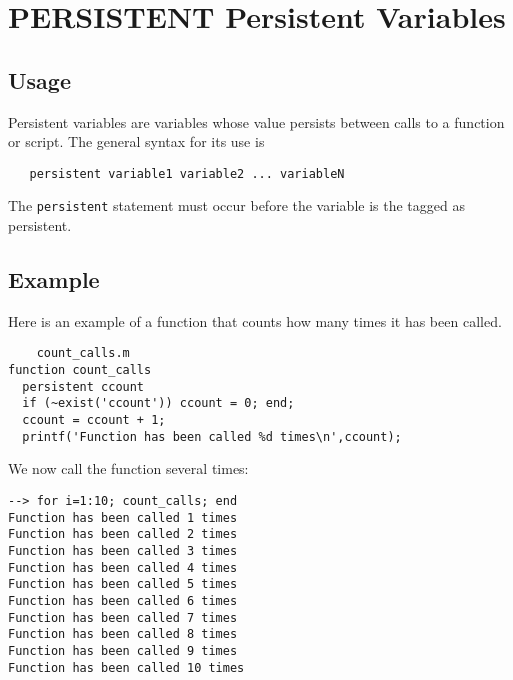 \section{PERSISTENT Persistent Variables}

\subsection{Usage}

Persistent variables are variables whose value persists between
calls to a function or script.  The general syntax for its
use is
\begin{verbatim}
   persistent variable1 variable2 ... variableN
\end{verbatim}
The \verb|persistent| statement must occur before the variable
is the tagged as persistent.
\subsection{Example}

Here is an example of a function that counts how many
times it has been called.
\begin{verbatim}
    count_calls.m
function count_calls
  persistent ccount
  if (~exist('ccount')) ccount = 0; end;
  ccount = ccount + 1;
  printf('Function has been called %d times\n',ccount);
\end{verbatim}
We now call the function several times:
\begin{verbatim}
--> for i=1:10; count_calls; end
Function has been called 1 times
Function has been called 2 times
Function has been called 3 times
Function has been called 4 times
Function has been called 5 times
Function has been called 6 times
Function has been called 7 times
Function has been called 8 times
Function has been called 9 times
Function has been called 10 times
\end{verbatim}
